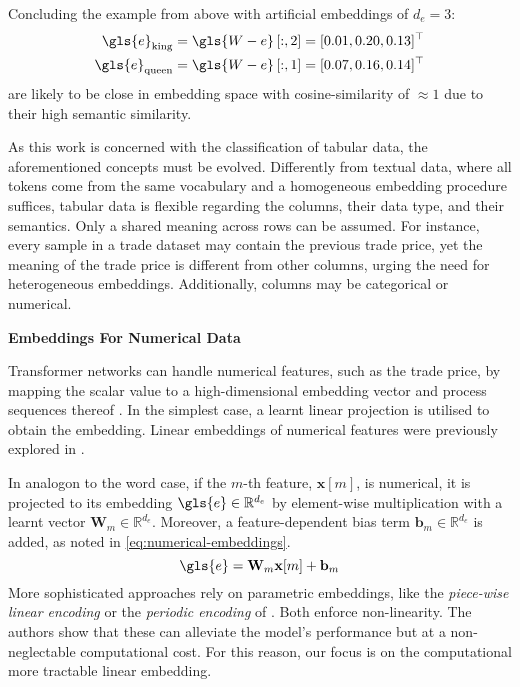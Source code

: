 Concluding the example from above with artificial embeddings of $d_e=3$:
\begin{equation}
    \begin{aligned}
        \gls{e}_{\mathrm{king}}  & =\gls{W-e}\left[:,2\right] = [0.01, 0.20, 0.13]^{\top} \\
        \gls{e}_{\mathrm{queen}} & =\gls{W-e}\left[:,1\right] = [0.07, 0.16, 0.14]^{\top} \\
    \end{aligned}
\end{equation}
are likely to be close in embedding space with cosine-similarity of $\approx 1$ due to their high semantic similarity.

As this work is concerned with the classification of tabular data, the aforementioned concepts must be evolved. Differently from textual data, where all tokens come from the same vocabulary and a homogeneous embedding procedure suffices, tabular data is flexible regarding the columns, their data type, and their semantics. Only a shared meaning across rows can be assumed. For instance, every sample in a trade dataset may contain the previous trade price, yet the meaning of the trade price is different from other columns, urging the need for heterogeneous embeddings. Additionally, columns may be categorical or numerical.

\textbf{Embeddings For Numerical Data}

Transformer networks can handle numerical features, such as the trade price, by mapping the scalar value to a high-dimensional embedding vector and process sequences thereof \autocite[][3]{gorishniyEmbeddingsNumericalFeatures2022}. In the simplest case, a learnt linear projection is utilised to obtain the embedding. Linear embeddings of numerical features were previously explored in \textcites[][3]{kossenSelfAttentionDatapointsGoing2021}[][4]{somepalliSaintImprovedNeural2021}[][4]{gorishniyRevisitingDeepLearning2021}.

In analogon to the word case, if the $m$-th feature, $\mathbf{x}[m]$, is numerical, it is projected to its embedding $\gls{e} \in \mathbb{R}^{d_e}$ by element-wise multiplication with a learnt vector $\mathbf{W}_m \in \mathbb{R}^{d_{e}}$. Moreover, a feature-dependent bias term $\mathbf{b}_m \in \mathbb{R}^{d_{e}}$ is added, as noted in \cref{eq:numerical-embeddings}.
\begin{equation}
    \gls{e}= \mathbf{W}_m \mathbf{x}[m] +\mathbf{b}_m
    \label{eq:numerical-embeddings}
\end{equation}
More sophisticated approaches rely on parametric embeddings, like the \emph{piece-wise linear encoding} or the \emph{periodic encoding} of \textcite[][10]{gorishniyEmbeddingsNumericalFeatures2022}. Both enforce non-linearity. The authors show that these can alleviate the model's performance but at a non-neglectable computational cost. For this reason, our focus is on the computational more tractable linear embedding.

